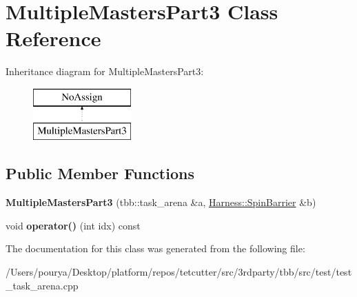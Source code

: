\hypertarget{classMultipleMastersPart3}{}\section{Multiple\+Masters\+Part3 Class Reference}
\label{classMultipleMastersPart3}
Inheritance diagram for Multiple\+Masters\+Part3\+:\begin{figure}[H]
\begin{center}
\leavevmode
\includegraphics[height=2.000000cm]{classMultipleMastersPart3}
\end{center}
\end{figure}
\subsection*{Public Member Functions}
\begin{DoxyCompactItemize}
\item 
\hypertarget{classMultipleMastersPart3_abc70e01d39504cfd227ab031636ff690}{}{\bfseries Multiple\+Masters\+Part3} (tbb\+::task\+\_\+arena \&a, \hyperlink{classHarness_1_1SpinBarrier}{Harness\+::\+Spin\+Barrier} \&b)\label{classMultipleMastersPart3_abc70e01d39504cfd227ab031636ff690}

\item 
\hypertarget{classMultipleMastersPart3_a4e3c4de9e8ed15e2cbc19973e093936f}{}void {\bfseries operator()} (int idx) const \label{classMultipleMastersPart3_a4e3c4de9e8ed15e2cbc19973e093936f}

\end{DoxyCompactItemize}


The documentation for this class was generated from the following file\+:\begin{DoxyCompactItemize}
\item 
/\+Users/pourya/\+Desktop/platform/repos/tetcutter/src/3rdparty/tbb/src/test/test\+\_\+task\+\_\+arena.\+cpp\end{DoxyCompactItemize}
